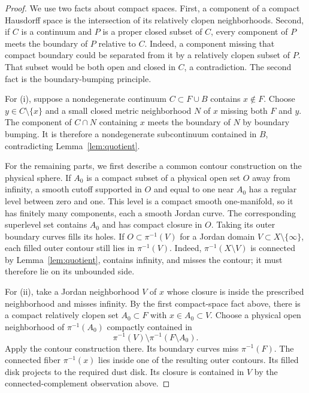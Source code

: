 \begin{proof}
We use two facts about compact spaces.  First, a component of a compact
Hausdorff space is the intersection of its relatively clopen
neighborhoods.  Second, if $C$ is a continuum and $P$ is a proper
closed subset of $C$, every component of $P$ meets the boundary of $P$
relative to $C$.  Indeed, a component missing that compact boundary
could be separated from it by a relatively clopen subset of $P$.
That subset would be both open and closed in $C$, a contradiction.
The second fact is the boundary-bumping principle.

For \textup{(i)}, suppose a nondegenerate continuum $C\subset F\cup B$
contains $x\notin F$.  Choose $y\in C\setminus\{x\}$ and a small
closed metric neighborhood $N$ of $x$ missing both $F$ and $y$.
The component of $C\cap N$ containing $x$ meets the boundary of $N$
by boundary bumping.  It is therefore a nondegenerate subcontinuum
contained in $B$, contradicting Lemma~\ref{lem:quotient}.

For the remaining parts, we first describe a common contour
construction on the physical sphere.
If $A_0$ is a compact subset of a physical open set $O$ away from
infinity, a smooth cutoff supported in $O$ and equal to one near $A_0$
has a regular level between zero and one.  This level is a compact
smooth one-manifold, so it has finitely many components, each a smooth
Jordan curve.  The corresponding superlevel set contains $A_0$ and
has compact closure in $O$.  Taking its outer boundary curves fills
its holes.  If $O\subset\pi^{-1}(V)$ for a Jordan domain
$V\subset X\setminus\{\infty\}$, each filled outer contour still
lies in $\pi^{-1}(V)$.  Indeed,
$\pi^{-1}(X\setminus V)$ is connected by
Lemma~\ref{lem:quotient}, contains infinity, and misses the contour;
it must therefore lie on its unbounded side.

For \textup{(ii)}, take a Jordan neighborhood $V$ of $x$
whose closure is inside the prescribed neighborhood and misses
infinity.  By the first compact-space fact above, there is a
compact relatively clopen set $A_0\subset F$ with
$x\in A_0\subset V$.  Choose a physical open neighborhood of
$\pi^{-1}(A_0)$ compactly contained in
\[
 \pi^{-1}(V)\setminus\pi^{-1}(F\setminus A_0).
\]
Apply the contour construction there.  Its boundary curves miss
$\pi^{-1}(F)$.  The connected fiber $\pi^{-1}(x)$ lies
inside one of the resulting outer contours.  Its filled disk projects
to the required dust disk.  Its closure is contained in $V$ by the
connected-complement observation above.


\end{proof}

